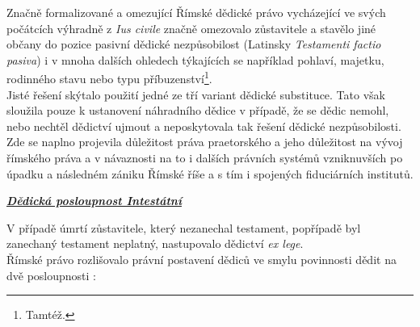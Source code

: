 \documentclass{article}
\begin{document}
Značně formalizované a omezující Římské dědické právo vycházející ve svých počátcích výhradně z \textit{Ius civile} značně omezovalo zůstavitele a stavělo jiné občany do pozice pasivní dědické nezpůsobilost (Latinsky \textit{Testamenti factio pasiva}) i v mnoha dalších ohledech týkajících se například pohlaví, majetku, rodinného stavu nebo typu příbuzenství\footnote{Tamtéž.}.\\

Jisté řešení skýtalo použití jedné ze tří variant dědické substituce. Tato však sloužila pouze k ustanovení náhradního dědice v případě, že se dědic nemohl, nebo nechtěl dědictví ujmout a neposkytovala tak řešení dědické nezpůsobilosti.\\

Zde se naplno projevila důležitost práva praetorského a jeho důležitost na vývoj římského práva a v návaznosti na to i dalších právních systémů vzniknuvších po úpadku a následném zániku Římské říše a s tím i spojených fiduciárních institutů.\\

\newpage

\underline{\textbf{\textit{Dědická posloupnost Intestátní}}}

\vspace*{5 mm}

V případě úmrtí zůstavitele, který nezanechal testament, popřípadě byl zanechaný testament neplatný, nastupovalo dědictví \textit{ex lege}.\\


Římské právo rozlišovalo právní postavení dědiců ve smylu povinnosti dědit na dvě posloupnosti :

\vspace{5 mm}
\end{document}
